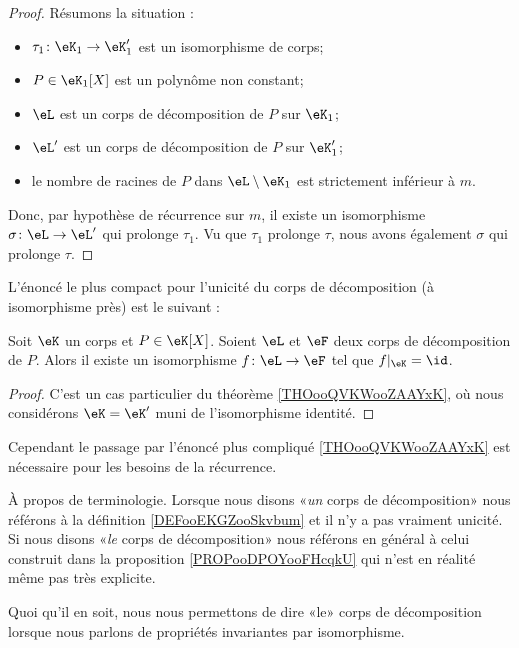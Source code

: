 \begin{proof}
    Résumons la situation :
    \begin{itemize}
        \item \( \tau_1\colon \eK_1\to \eK'_1\) est un isomorphisme de corps;
        \item \( P\in \eK_1[X]\) est un polynôme non constant;
        \item \( \eL\) est un corps de décomposition de \( P\) sur \( \eK_1\);
        \item \( \eL'\) est un corps de décomposition de \( P\) sur \( \eK'_1\);
        \item le nombre de racines de \( P\) dans \( \eL\setminus \eK_1\) est strictement inférieur à \( m\).
    \end{itemize}
    Donc, par hypothèse de récurrence sur \( m\), il existe un isomorphisme \( \sigma\colon \eL\to \eL'\) qui prolonge \( \tau_1\). Vu que \( \tau_1\) prolonge \( \tau\), nous avons également \( \sigma\) qui prolonge \( \tau\).
\end{proof}

L'énoncé le plus compact pour l'unicité du corps de décomposition (à isomorphisme près) est le suivant :
\begin{proposition}     \label{PropTMkfyM}
    Soit \( \eK\) un corps et \( P\in\eK[X]\). Soient \( \eL\) et \( \eF\) deux corps de décomposition de \( P\). Alors il existe un isomorphisme \( f\colon \eL\to \eF\) tel que \( f|_{\eK}=\id\).
\end{proposition}
\begin{proof}
    C'est un cas particulier du théorème \ref{THOooQVKWooZAAYxK}, où nous considérons \( \eK=\eK'\) muni de l'isomorphisme identité.
\end{proof}

Cependant le passage par l'énoncé plus compliqué \ref{THOooQVKWooZAAYxK} est nécessaire pour les besoins de la récurrence.

\begin{normaltext}
    À propos de terminologie. Lorsque nous disons «\emph{un} corps de décomposition» nous référons à la définition \ref{DEFooEKGZooSkvbum} et il n'y a pas vraiment unicité. Si nous disons «\emph{le} corps de décomposition» nous référons en général à celui construit dans la proposition \ref{PROPooDPOYooFHcqkU} qui n'est en réalité même pas très explicite.

    Quoi qu'il en soit, nous nous permettons de dire «le» corps de décomposition lorsque nous parlons de propriétés invariantes par isomorphisme.
\end{normaltext}

